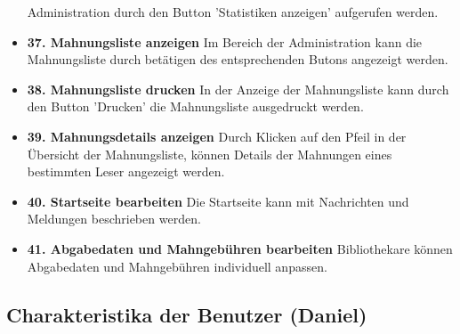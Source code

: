 \documentclass[fontsize=12pt,paper=a4,twoside]{scrartcl}
\begin{document}
\begin{itemize}
  Administration durch den Button
  'Statistiken anzeigen' aufgerufen werden.
  \item \textbf{37. Mahnungsliste anzeigen}
  Im Bereich der Administration kann die
  Mahnungsliste durch betätigen des 
  entsprechenden Butons angezeigt werden.
  \item \textbf{38. Mahnungsliste drucken}
  In der Anzeige der Mahnungsliste kann durch 
  den Button 'Drucken' die Mahnungsliste
  ausgedruckt werden.
  \item \textbf{39. Mahnungsdetails anzeigen}
  Durch Klicken auf den Pfeil in der 
  Übersicht der Mahnungsliste, können Details
  der Mahnungen eines bestimmten Leser 
  angezeigt werden.
  \item \textbf{40. Startseite bearbeiten}
  Die Startseite kann mit Nachrichten und
  Meldungen beschrieben werden.
  \item \textbf{41. Abgabedaten und Mahngebühren bearbeiten}
  Bibliothekare können Abgabedaten und
  Mahngebühren individuell anpassen.
 \end{itemize}


\subsection{Charakteristika der Benutzer (Daniel)}
\end{document}
